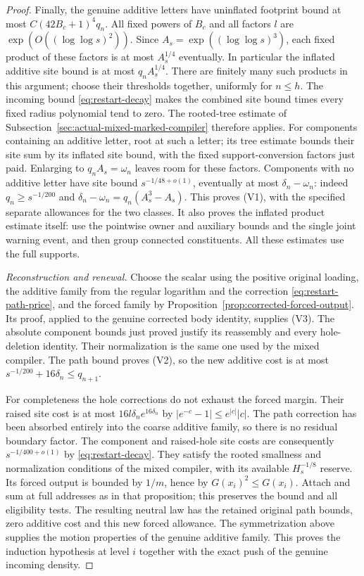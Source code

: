 \begin{proof}
Finally, the genuine additive letters have uninflated footprint bound
at most $C(42B_c+1)^4q_n$. All fixed powers of $B_c$ and all factors
$l$ are $\exp(O((\log\log s)^2))$. Since
$A_s=\exp((\log\log s)^3)$, each fixed product of these factors is
at most $A_s^{1/4}$ eventually. In particular the inflated additive
site bound is at most $q_nA_s^{1/4}$. There are finitely many such
products in this argument; choose their thresholds together, uniformly
for $n\le h$. The incoming bound \eqref{eq:restart-decay} makes the
combined site bound times every fixed radius polynomial tend to zero.
The rooted-tree estimate of
Subsection~\ref{sec:actual-mixed-marked-compiler} therefore applies.
For components containing an additive letter, root at such a letter;
its tree estimate bounds their site sum by its inflated site bound,
with the fixed support-conversion factors just paid. Enlarging to
$q_nA_s=\omega_n$ leaves room for these factors. Components with no
additive letter have site bound $s^{-1/48+o(1)}$, eventually at most
$\delta_n-\omega_n$: indeed $q_n\ge s^{-1/200}$ and
$\delta_n-\omega_n=q_n(A_s^3-A_s)$. This proves (V1), with the
specified separate allowances for the two classes. It also proves
the inflated product estimate itself: use the pointwise owner and
auxiliary bounds and the single joint warning event, and then group
connected constituents. All these estimates use the full supports.

\emph{Reconstruction and renewal.}
Choose the scalar using the positive original loading, the additive
family from the regular logarithm and the correction
\eqref{eq:restart-path-price}, and the forced family by
Proposition~\ref{prop:corrected-forced-output}. Its proof, applied to
the genuine corrected body identity, supplies (V3). The absolute
component bounds just proved justify its reassembly and every
hole-deletion identity. Their normalization is the same one used by
the mixed compiler. The path bound proves (V2), so the new additive
cost is at most $s^{-1/200}+16\delta_n\le q_{n+1}$.

For completeness the hole corrections do not exhaust the forced
margin. Their raised site cost is at most
$16l\delta_n e^{16\delta_n}$ by
$|e^{-c}-1|\le e^{|c|}|c|$. The path correction has been absorbed entirely into the coarse
additive family, so there is no residual boundary factor. The component
and raised-hole site costs are consequently $s^{-1/400+o(1)}$ by
\eqref{eq:restart-decay}. They satisfy the rooted smallness and
normalization conditions of the mixed compiler, with its available
$H_s^{-1/8}$ reserve. Its forced output is bounded by $1/m$, hence
by $G(x_i)^2\le G(x_i)$. Attach and sum at full addresses as in
that proposition; this preserves the bound and all eligibility tests.
The resulting neutral law has the retained original path bounds, zero
additive cost and this new forced allowance. The symmetrization above
supplies the motion properties of the genuine additive family.
This proves the induction hypothesis at level $i$ together with the
exact push of the genuine incoming density.


\end{proof}
